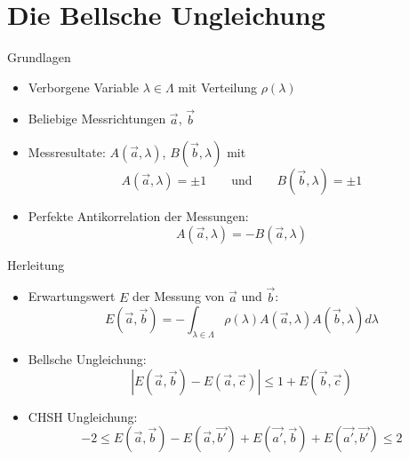 \documentclass{beamer}
\begin{document}
\section{Die Bellsche Ungleichung}
\begin{frame}{Grundlagen}
    \begin{itemize}
        \item Verborgene Variable $\lambda \in \Lambda$ mit Verteilung $\rho(\lambda)$
        \item Beliebige Messrichtungen $\vec{a}$, $\vec{b}$
        \item Messresultate: $A(\vec{a},\lambda)$, $B(\vec{b},\lambda)$ mit
            \[
                A(\vec{a},\lambda) = \pm 1 
                \qquad \text{und}\qquad 
                B(\vec{b},\lambda) = \pm 1
            \]
        \item Perfekte Antikorrelation der Messungen:
            \[
                A(\vec{a},\lambda) = -B(\vec{a},\lambda)
            \]
    \end{itemize}
\end{frame}
\begin{frame}{Herleitung}
    \begin{itemize}
        \item Erwartungswert $E$ der Messung von $\vec{a}$ und $\vec{b}$:
            \[
                E(\vec{a},\vec{b}) = -\int_{\lambda\in\Lambda} 
                    \rho(\lambda) A(\vec{a},\lambda) A(\vec{b},\lambda) d\lambda
            \]
        \item<2-> Bellsche Ungleichung:
            \[
                \left| E(\vec{a},\vec{b}) - E(\vec{a},\vec{c}) \right| 
                \leq
                1 + E(\vec{b},\vec{c})
            \]
        \item<3-> CHSH Ungleichung:
            \[
                -2 \leq 
                E(\vec{a},\vec{b}) - E(\vec{a},\vec{b'}) + E(\vec{a'},\vec{b}) + E(\vec{a'},\vec{b'})
                \leq 2
            \]
    \end{itemize}
\end{frame}
\end{document}
